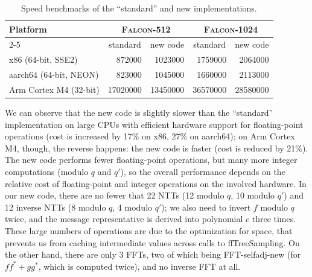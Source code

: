 \documentclass{llncs}
\newcommand{\adj}[1]{{#1}^*}
\begin{document}
\begin{table}
    \begin{center}
        {\renewcommand{\arraystretch}{1.1}%
        \setlength{\tabcolsep}{1em}%
        \begin{tabular}{|l|r|r|r|r|}
            \hline
            \textsf{\textbf{Platform}}
            & \multicolumn{2}{c|}{\textsc{Falcon}-512}
            & \multicolumn{2}{c|}{\textsc{Falcon}-1024} \\
            \cline{2-5}
            & \multicolumn{1}{c|}{standard}
            & \multicolumn{1}{c|}{new code}
            & \multicolumn{1}{c|}{standard}
            & \multicolumn{1}{c|}{new code} \\
            \hline
            x86 (64-bit, SSE2)     &   872000 &  1023000 &  1759000 &  2064000 \\
            aarch64 (64-bit, NEON) &   823000 &  1045000 &  1660000 &  2113000 \\
            Arm Cortex M4 (32-bit) & 17020000 & 13450000 & 36570000 & 28580000 \\
            \hline
        \end{tabular}}
    \end{center}
    \caption{\label{tab:speed}Speed benchmarks of the ``standard''
    and new implementations.}
\end{table}

We can observe that the new code is slightly slower than the
``standard'' implementation on large CPUs with efficient hardware
support for floating-point operations (cost is increased by 17\% on x86,
27\% on aarch64); on Arm Cortex M4, though, the reverse happens: the new
code is faster (cost is reduced by 21\%). The new code performs fewer
floating-point operations, but many more integer computations (modulo
$q$ and $q'$), so the overall performance depends on the relative cost
of floating-point and integer operations on the involved hardware. In
our new code, there are no fewer that 22 NTTs (12 modulo $q$, 10 modulo
$q'$) and 12 inverse NTTs (8 modulo $q$, 4 modulo $q'$); we also need to
invert $f$ modulo $q$ twice, and the message representative is derived
into polynomial $c$ three times. These large numbers of operations are
due to the optimization for space, that prevents us from caching
intermediate values across calls to \textsf{ffTreeSampling}. On the
other hand, there are only 3 FFTs, two of which being
\textsf{FFT-selfadj-new} (for $f\adj{f} + g\adj{g}$, which is computed
twice), and no inverse FFT at all.
\end{document}
